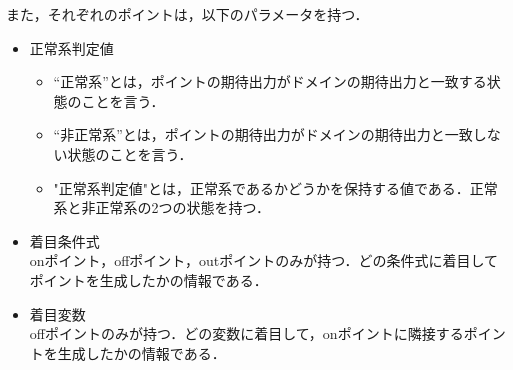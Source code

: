 \documentclass[uplatex, report, a4j, 10pt]{jsbook}
\begin{document}
また，それぞれのポイントは，以下のパラメータを持つ．
\begin{itemize}
	\item 正常系判定値
	\begin{itemize}
		\item “正常系”とは，ポイントの期待出力がドメインの期待出力と一致する状態のことを言う．
		\item “非正常系”とは，ポイントの期待出力がドメインの期待出力と一致しない状態のことを言う．
		\item "正常系判定値"とは，正常系であるかどうかを保持する値である．正常系と非正常系の2つの状態を持つ．
	\end{itemize}
	\item 着目条件式\\
			onポイント，offポイント，outポイントのみが持つ．どの条件式に着目してポイントを生成したかの情報である．
	\item 着目変数\\
			offポイントのみが持つ．どの変数に着目して，onポイントに隣接するポイントを生成したかの情報である．
\end{itemize}
\end{document}
